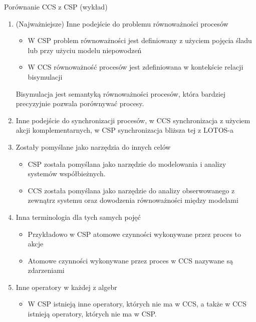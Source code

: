 \documentclass[a4paper,15pt]{article}
\newcommand{\issue}[2]{
    \begin{tcolorbox}[colback=issueColor!5!white,colframe=issueColor,title={Zagadnienie #1}]
        #2
    \end{tcolorbox}
}
\begin{document}
\issue{2}{
Porównanie CCS z CSP (wykład)
}

\begin{enumerate}

\item (Najważniejsze) Inne podejście do problemu równoważności procesów
\begin{itemize}
\item W CSP problem równoważności jest definiowany z użyciem pojęcia śladu lub przy użyciu modelu niepowodzeń
\item W CCS równoważność procesów jest zdefiniowana w kontekście relacji bisymulacji
\end{itemize}
Bisymulacja jest semantyką równoważności procesów, która bardziej precyzyjnie pozwala porównywać procesy.  

\item Inne podejście do synchronizacji procesów, w CCS synchronizacja z użyciem akcji komplementarnych, w CSP synchronizacja bliższa tej z LOTOS-a

\item Zostały pomyślane jako narzędzia do innych celów
\begin{itemize}
\item CSP została pomyślana jako narzędzie do modelowania i analizy systemów współbieżnych.
\item CCS została pomyślana jako narzędzie do analizy obserwowanego z zewnątrz systemu oraz dowodzenia równoważności między modelami 
\end{itemize}

\item Inna terminologia dla tych samych pojęć
\begin{itemize}
\item Przykładowo w CSP atomowe czynności wykonywane przez proces to akcje
\item Atomowe czynności wykonywane przez proces w CCS nazywane są zdarzeniami
\end{itemize}

\item Inne operatory w każdej z algebr
\begin{itemize}
\item W CSP istnieją inne operatory, których nie ma w CCS, a także w CCS istnieją operatory, których nie ma w CSP.
\end{itemize}

\end{enumerate}
\end{document}
